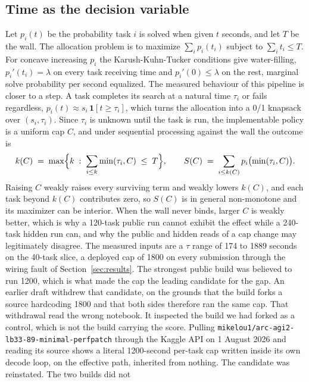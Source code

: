 \documentclass[11pt]{article}
\begin{document}
\subsection{Time as the decision variable}

Let $p_i(t)$ be the probability task $i$ is solved when given $t$ seconds, and let $T$ be the wall. The
allocation problem is to maximize $\sum_i p_i(t_i)$ subject to $\sum_i t_i \le T$. For concave increasing
$p_i$ the Karush-Kuhn-Tucker conditions give water-filling, $p_i'(t_i) = \lambda$ on every task receiving
time and $p_i'(0) \le \lambda$ on the rest, marginal solve probability per second equalized. The measured
behaviour of this pipeline is closer to a step. A task completes its search at a natural time $\tau_i$ or
fails regardless, $p_i(t) \approx s_i\,\mathbf{1}[t \ge \tau_i]$, which turns the allocation into a 0/1
knapsack over $(s_i, \tau_i)$. Since $\tau_i$ is unknown until the task is run, the implementable policy
is a uniform cap $C$, and under sequential processing against the wall the outcome is
\begin{equation}
k(C) \;=\; \max\Bigl\{k \;:\; \sum_{i\le k}\min(\tau_i, C)\;\le\; T\Bigr\},
\qquad
S(C) \;=\; \sum_{i \le k(C)} p_i\bigl(\min(\tau_i, C)\bigr).
\label{eq:cap}
\end{equation}
Raising $C$ weakly raises every surviving term and weakly lowers $k(C)$, and each task beyond $k(C)$
contributes zero, so $S(C)$ is in general non-monotone and its maximizer can be interior. When the wall
never binds, larger $C$ is weakly better, which is why a 120-task public run cannot exhibit the effect
while a 240-task hidden run can, and why the public and hidden reads of a cap change may legitimately
disagree. The measured inputs are a $\tau$ range of 174 to 1889 seconds on the 40-task slice, a deployed
cap of 1800 on every submission through the wiring fault of Section~\ref{sec:results}. The strongest
public build was believed to run 1200, which is what made the cap the leading candidate for the gap.
An earlier draft withdrew that candidate, on the grounds that the build forks a source hardcoding
1800 and that both sides therefore ran the same cap. That withdrawal read the wrong notebook. It
inspected the build we had forked as a control, which is not the build carrying the score. Pulling
\texttt{mikelou1/arc-agi2-lb33-89-minimal-perfpatch} through the Kaggle API on 1 August 2026 and
reading its source shows a literal 1200-second per-task cap written inside its own decode loop,
on the effective path, inherited from nothing. The candidate was reinstated. The two builds did not
\end{document}
